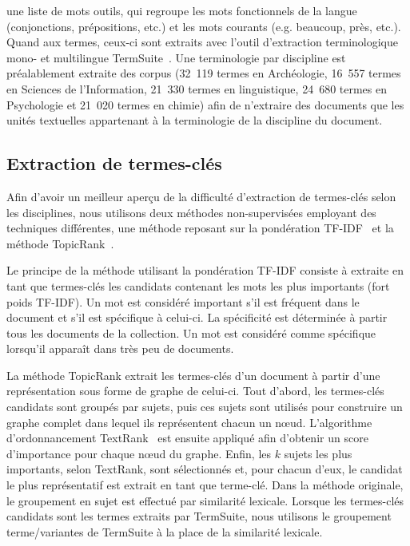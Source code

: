     une liste de mots outils, qui regroupe les mots fonctionnels de la langue
    (conjonctions, prépositions, etc.) et les mots courants (e.g.
    \og{}beaucoup\fg{}, \og{}près\fg{}, etc.). Quand aux termes, ceux-ci sont
    extraits avec l'outil d'extraction terminologique mono- et multilingue
    TermSuite~\cite{rocheteau2011termsuite}. Une terminologie par discipline est
    préalablement extraite des corpus (32~119 termes en Archéologie, 16~557
    termes en Sciences de l'Information, 21~330 termes en linguistique, 24~680
    termes en Psychologie et 21~020 termes en chimie) afin de n'extraire des
    documents que les unités textuelles appartenant à la terminologie de la
    discipline du document.

  \subsection{Extraction de termes-clés}
  \label{subsec:extraction_de_termes_cles}
    Afin d'avoir un meilleur aperçu de la difficulté d'extraction de termes-clés
    selon les disciplines, nous utilisons deux méthodes non-supervisées
    employant des techniques différentes, une méthode reposant sur la
    pondération TF-IDF~\cite{jones1972tfidf} et la méthode
    TopicRank~\cite{bougouin2013topicrank}.

    Le principe de la méthode utilisant la pondération TF-IDF consiste à
    extraite en tant que termes-clés les candidats contenant les mots les plus
    importants (fort poids TF-IDF). Un mot est considéré important s'il est
    fréquent dans le document et s'il est spécifique à celui-ci. La spécificité
    est déterminée à partir tous les documents de la collection. Un mot est
    considéré comme spécifique lorsqu'il apparaît dans très peu de documents.

    La méthode TopicRank extrait les termes-clés d'un document à partir d'une
    représentation sous forme de graphe de celui-ci. Tout d'abord, les
    termes-clés candidats sont groupés par sujets, puis ces sujets sont utilisés
    pour construire un graphe complet dans lequel ils représentent chacun un
    n\oe{}ud. L'algorithme d'ordonnancement
    TextRank~\cite{mihalcea2004textrank} est ensuite appliqué afin d'obtenir un
    score d'importance pour chaque n\oe{}ud du graphe. Enfin, les $k$ sujets les
    plus importants, selon TextRank, sont sélectionnés et, pour chacun d'eux, le
    candidat le plus représentatif est extrait en tant que terme-clé. Dans la
    méthode originale, le groupement en sujet est effectué par similarité
    lexicale. Lorsque les termes-clés candidats sont les termes extraits par
    TermSuite, nous utilisons le groupement terme/variantes de TermSuite à la
    place de la similarité lexicale.

